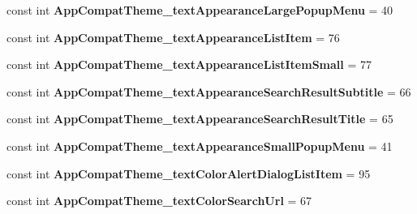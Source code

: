\begin{DoxyCompactItemize}
\item 
\mbox{\label{classXaria_1_1Resource_1_1Styleable_afea90e5124c8930de78772ddfbe7c2be}} 
const int {\bfseries App\+Compat\+Theme\+\_\+text\+Appearance\+Large\+Popup\+Menu} = 40
\item 
\mbox{\label{classXaria_1_1Resource_1_1Styleable_a5e3a0a6fc1d2c76f7b6fb5edb4f2920f}} 
const int {\bfseries App\+Compat\+Theme\+\_\+text\+Appearance\+List\+Item} = 76
\item 
\mbox{\label{classXaria_1_1Resource_1_1Styleable_acdf031035dfdd6d9cbda18a14fb53d7a}} 
const int {\bfseries App\+Compat\+Theme\+\_\+text\+Appearance\+List\+Item\+Small} = 77
\item 
\mbox{\label{classXaria_1_1Resource_1_1Styleable_a0197ce556cd6390163f552bb89205fe1}} 
const int {\bfseries App\+Compat\+Theme\+\_\+text\+Appearance\+Search\+Result\+Subtitle} = 66
\item 
\mbox{\label{classXaria_1_1Resource_1_1Styleable_a5e53660b90520d08959dccc4d2d7bd91}} 
const int {\bfseries App\+Compat\+Theme\+\_\+text\+Appearance\+Search\+Result\+Title} = 65
\item 
\mbox{\label{classXaria_1_1Resource_1_1Styleable_ac0a2565c9797c8a6bbf609d0cb622e84}} 
const int {\bfseries App\+Compat\+Theme\+\_\+text\+Appearance\+Small\+Popup\+Menu} = 41
\item 
\mbox{\label{classXaria_1_1Resource_1_1Styleable_a62f0e73053ebb697262de48ad9228b1d}} 
const int {\bfseries App\+Compat\+Theme\+\_\+text\+Color\+Alert\+Dialog\+List\+Item} = 95
\item 
\mbox{\label{classXaria_1_1Resource_1_1Styleable_a0a95b6912819709d7bdeda001ae51a08}} 
const int {\bfseries App\+Compat\+Theme\+\_\+text\+Color\+Search\+Url} = 67
\item 
\mbox{\label{classXaria_1_1Resource_1_1Styleable_a27893d428d9f751a3b61094dd3273945}} 

\end{DoxyCompactItemize}
